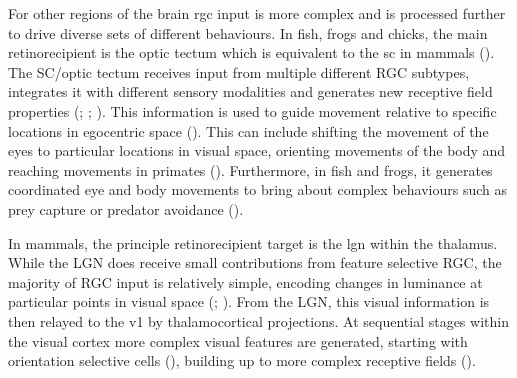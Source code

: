 For other regions of the brain \gls{rgc} input is more complex and is processed further to drive diverse sets of different behaviours. In fish, frogs and chicks, the main retinorecipient is the optic tectum which is equivalent to the \gls{sc} in mammals (\cite{Goodhill2005}).  The SC/optic tectum receives input from multiple different RGC subtypes, integrates it with different sensory modalities and  generates new receptive field properties (\cite{Robles2014}; \cite{Dhande2014RetinalProcessing}; \cite{Hunter2013}). This information is used to guide movement relative to specific locations in egocentric space (\cite{Gandhi2011MotorColliculus}). This can include shifting the movement of the eyes to particular locations in visual space, orienting movements of the body and reaching movements in primates (\cite{Straschill1970ActivityMovements,Sparks1976SizeColliculus, Stuphorn2000NeuronsCoordinates, Song2015NeuralColliculus}). Furthermore, in fish and frogs, it generates coordinated eye and body movements to bring about complex behaviours such as prey capture or predator avoidance (\cite{Gahtan2005, Bianco2015, Dunn2016,Ewert1987NeuroethologyToads,King1996VisuallyCapture}). 

In mammals, the principle retinorecipient target is the \gls{lgn} within the thalamus. While the LGN does receive small contributions from feature selective RGC, the majority of RGC input is relatively simple, encoding changes in luminance at particular points in visual space (\cite{Jeffries2014MappingMethods}; \cite{Kim2008MolecularMotion}).  From the LGN, this visual information is then relayed to the \gls{v1} by thalamocortical projections. At sequential stages within the visual cortex more complex visual features are generated, starting with orientation selective cells (\cite{Hubel1962ReceptiveCortex}), building up to more complex receptive fields (\cite{Martinez2001ConstructionCortex}).

